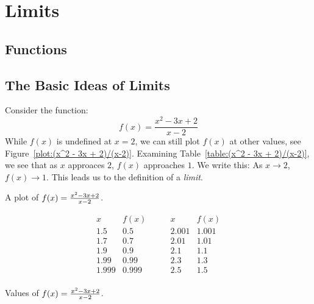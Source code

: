 \chapter{Limits}

\section{Functions}{}{}



\section{The Basic Ideas of Limits}{}{}

Consider the function:
\[
f(x) = \frac{x^2 - 3x + 2}{x-2}
\]
While $f(x)$ is undefined at $x=2$, we can still plot $f(x)$ at other
values, see Figure~\ref{plot:(x^2 - 3x + 2)/(x-2)}. Examining
Table~\ref{table:(x^2 - 3x + 2)/(x-2)}, we see that as $x$ approaces
$2$, $f(x)$ approaches $1$. We write this: As $x \to 2$, $f(x) \to 1$.
This leads us to the definition of a \textit{limit}.


\begin{marginfigure}
\caption{A plot of $f(x)=\protect\frac{x^2 - 3x + 2}{x-2}$.}
\label{plot:(x^2 - 3x + 2)/(x-2)}
\end{marginfigure}

\begin{margintable}
\[
\begin{array}{c|c}
 x & f(x) \\ \hline
 1.5 &  0.5 \\
 1.7 &  0.7 \\
 1.9 &  0.9 \\
 1.99 &  0.99 \\
 1.999 &  0.999 \\
\end{array}\qquad
\begin{array}{c|c}
 x & f(x) \\ \hline
 2.001&  1.001\\
 2.01&  1.01\\
 2.1 &  1.1 \\
 2.3 &  1.3 \\
 2.5 &  1.5 \\
\end{array}
\]
\caption{Values of $f(x)=\protect\frac{x^2 - 3x + 2}{x-2}$.}
\label{table:(x^2 - 3x + 2)/(x-2)}
\end{margintable}


